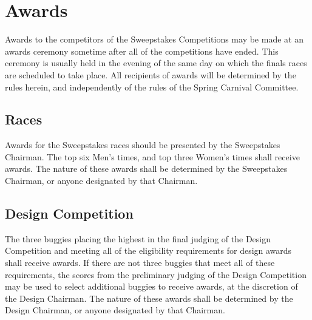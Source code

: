 \chapter{Awards}

	Awards to the competitors of the Sweepstakes Competitions may be made at an
	awards ceremony sometime after all of the competitions have ended. This 
	ceremony is usually held in the evening of the same day on which the finals
	races are scheduled to take place. All recipients of awards will be 
	determined by the rules herein, and independently of the rules of the Spring
	Carnival Committee.

\section{Races}

	Awards for the Sweepstakes races should be presented by the Sweepstakes
	Chairman. The top six Men's times, and top three Women's times shall receive 
	awards. The nature of these awards shall be determined by the Sweepstakes 
	Chairman, or anyone designated by that Chairman.

\section{Design Competition}

	The three buggies placing the highest in the final judging of the Design 
	Competition and meeting all of the eligibility requirements for design 
	awards shall receive awards. If there are not three buggies that meet all 
	of these requirements, the scores from the preliminary judging of the Design
	Competition may be used to select additional buggies to receive awards, at 
	the discretion of the Design Chairman. The nature of these awards shall be 
	determined by the Design Chairman, or anyone designated by that Chairman.

